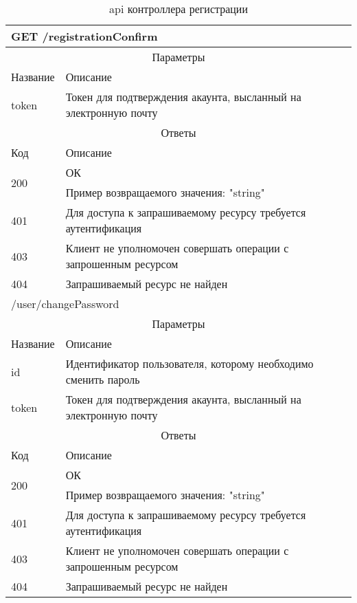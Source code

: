 \begin{table}[H]
  \caption{api контроллера регистрации}\label{api-registration-table}
  \begin{tabular}{|p{6cm}|p{10cm}|}
  \hline \multicolumn{2}{|l|}{GET /registrationConfirm} \\
  \hline \multicolumn{2}{|c|}{Параметры} \\
  \hline Название & Описание \\
  \hline token & Токен для подтверждения акаунта, высланный на электронную почту \\
  \hline \multicolumn{2}{|c|}{Ответы} \\
  \hline Код & Описание \\
  \hline \multirow{2}{=}{200} & ОК \\
   & Пример возвращаемого значения: "string" \\
  \hline 401 & Для доступа к запрашиваемому ресурсу требуется аутентификация \\
  \hline 403 & Клиент не уполномочен совершать операции с запрошенным ресурсом \\
  \hline 404 & Запрашиваемый ресурс не найден \\
  \hline \multicolumn{2}{|l|}{/user/changePassword} \\
  \hline \multicolumn{2}{|c|}{Параметры} \\
  \hline Название & Описание \\
  \hline id & Идентификатор пользователя, которому необходимо сменить пароль \\
  \hline token & Токен для подтверждения акаунта, высланный на электронную почту \\
  \hline \multicolumn{2}{|c|}{Ответы} \\
  \hline Код & Описание \\
  \hline \multirow{2}{=}{200} & ОК \\
   & Пример возвращаемого значения: "string" \\
  \hline 401 & Для доступа к запрашиваемому ресурсу требуется аутентификация \\
  \hline 403 & Клиент не уполномочен совершать операции с запрошенным ресурсом \\
  \hline 404 & Запрашиваемый ресурс не найден \\
  \hline
  \end{tabular}
\end{table}
